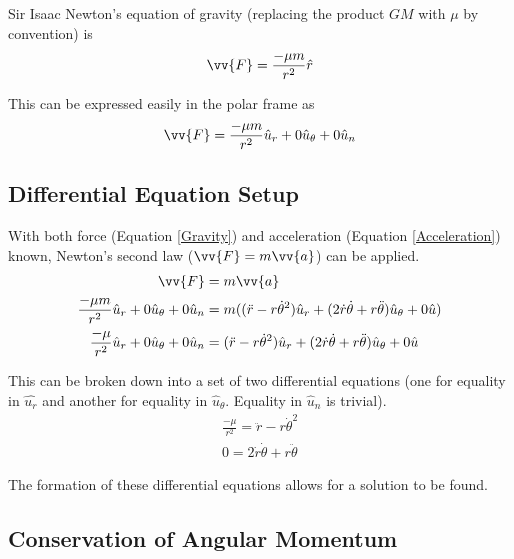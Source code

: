 \documentclass[../basicOrbitalDynamics.tex]{subfiles}
\begin{document}
Sir Isaac Newton's equation of gravity (replacing the product $GM$ with $\mu$ by convention) is
$$\vv{F}=\frac{-\mu{}m}{r^2}\hat{r}$$

This can be expressed easily in the polar frame as
\begin{equation}\label{Gravity}
    \vv{F}=\frac{-\mu{}m}{r^2}\hat{u}_r+0\hat{u}_\theta+0\hat{u}_n
\end{equation}

\bigskip\bigskip
\subsection{Differential Equation Setup}\label{sec:Differential Equation Setup}

With both force (Equation \eqref{Gravity}) and acceleration (Equation \eqref{Acceleration}) known, Newton's second law ($\vv{F}=m\vv{a}$) can be applied.
\begin{align*}
    \vv{F}                                                  & =m\vv{a}                                                                                              \\
    \frac{-\mu{}m}{r^2}\hat{u}_r+0\hat{u}_\theta+0\hat{u}_n & = m((\ddot{r}-r\dot{\theta}^2)\hat{u}_r+(2\dot{r}\dot{\theta}+r\ddot{\theta})\hat{u}_\theta+0\hat{u}) \\
    \frac{-\mu{}}{r^2}\hat{u}_r+0\hat{u}_\theta+0\hat{u}_n  & = (\ddot{r}-r\dot{\theta}^2)\hat{u}_r+(2\dot{r}\dot{\theta}+r\ddot{\theta})\hat{u}_\theta+0\hat{u}
\end{align*}

This can be broken down into a set of two differential equations (one for equality in $\hat{u_r}$ and another for equality in $\hat{u}_\theta$. Equality in $\hat{u}_n$ is trivial).
\begin{subequations}\label{Differential Equation}
    \begin{align}
        \frac{-\mu{}}{r^2} = \ddot{r}-r\dot{\theta}^2\label{Differential Equation:r} \\
        0  = 2\dot{r}\dot{\theta}+r\ddot{\theta}\label{Differential Equation:theta}
    \end{align}
\end{subequations}

The formation of these differential equations allows for a solution to be found.

\bigskip\bigskip
\subsection{Conservation of Angular Momentum}
\end{document}
